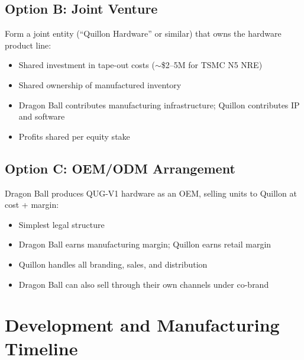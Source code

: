 \documentclass[11pt,a4paper]{article}
\begin{document}
\subsection{Option B: Joint Venture}

Form a joint entity (``Quillon Hardware'' or similar) that owns the hardware product line:

\begin{itemize}[leftmargin=1.5em]
    \item Shared investment in tape-out costs ($\sim$\$2--5M for TSMC N5 NRE)
    \item Shared ownership of manufactured inventory
    \item Dragon Ball contributes manufacturing infrastructure; Quillon contributes IP and software
    \item Profits shared per equity stake
\end{itemize}

\subsection{Option C: OEM/ODM Arrangement}

Dragon Ball produces QUG-V1 hardware as an OEM, selling units to Quillon at cost + margin:

\begin{itemize}[leftmargin=1.5em]
    \item Simplest legal structure
    \item Dragon Ball earns manufacturing margin; Quillon earns retail margin
    \item Quillon handles all branding, sales, and distribution
    \item Dragon Ball can also sell through their own channels under co-brand
\end{itemize}


\section{Development and Manufacturing Timeline}
\end{document}
